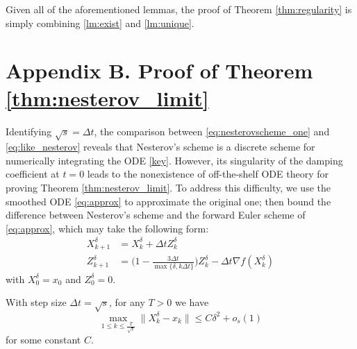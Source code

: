 \documentclass[twoside,11pt]{article}
\begin{document}
Given all of the aforementioned lemmas, the proof of Theorem \ref{thm:regularity} is simply combining \ref{lm:exist} and \ref{lm:unique}.











\section*{Appendix B. Proof of Theorem \ref{thm:nesterov_limit}}\label{app:bb}

Identifying $\sqrt{s} = \Delta t$, the comparison between \eqref{eq:nesterovscheme_one} and \eqref{eq:like_nesterov} reveals that Nesterov's scheme is a discrete scheme for numerically integrating the ODE \eqref{key}. However, its singularity of the damping coefficient  at $t = 0$ leads to the nonexistence of off-the-shelf ODE theory for proving Theorem \ref{thm:nesterov_limit}. To address this difficulty, we use the smoothed ODE \eqref{eq:approx} to approximate the original one; then bound the difference between Nesterov's scheme and the forward Euler scheme of \eqref{eq:approx}, which may take the following form:
\begin{equation}\label{eq:euler_x_z}
\begin{aligned}
X_{k+1}^{\delta} &= X_k^{\delta} + \Delta t Z_k^{\delta}\\
Z_{k+1}^{\delta} & = \Big( 1 - \frac{3\Delta t}{\max\{\delta, k\Delta t\}} \Big) Z_k^{\delta} - \Delta t \nabla f(X_k^{\delta})
\end{aligned}
\end{equation}
with $X_0^{\delta} = x_0$ and $Z_0^{\delta} = 0$.

\begin{lemma}\label{lm:euler_nesterov}
With step size $\Delta t = \sqrt{s}$, for any $T > 0$ we have
\[
\max_{1 \le k \le \frac{T}{\sqrt{s}}}\|X_k^{\delta} - x_k\| \le C\delta^2 + o_s(1)
\]
for some constant $C$.
\end{lemma}
\end{document}

